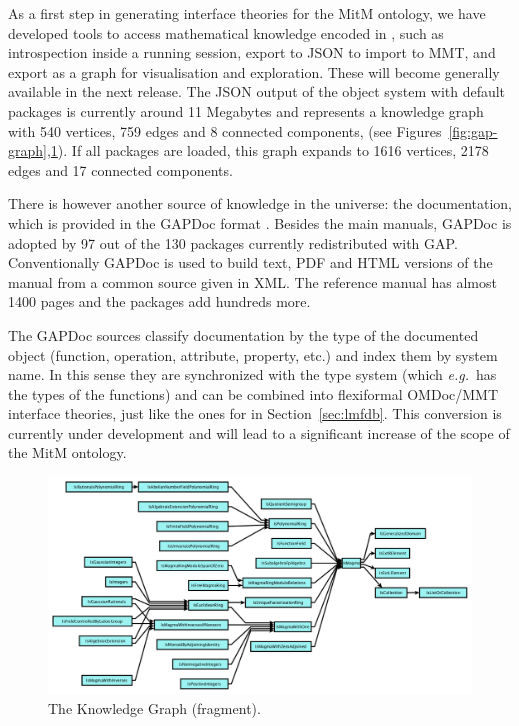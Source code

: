 As a first step in generating interface theories for the MitM ontology, we have developed
tools to access mathematical knowledge encoded in \GAP, such as introspection inside a
running \GAP session, export to JSON to import to MMT, and export as a graph for
visualisation and exploration. These will become generally available in the next \GAP
release. The JSON output of the \GAP object system with default packages is currently
around 11 Megabytes and represents a knowledge graph with 540 vertices, 759 edges and 8 connected
components, (see Figures~\ref{fig:gap-graph},\ref{fig:gap-ismagma}). If all
packages are loaded, this graph expands to 1616 vertices, 2178 edges and 17 connected
components.

There is however another source of knowledge in the \GAP universe: the documentation, which is
provided in the GAPDoc format \cite{gapdoc}. Besides the main manuals, GAPDoc
is adopted by 97 out of the 130 packages currently redistributed with
GAP. Conventionally GAPDoc is used to build text, PDF and HTML versions of the manual
from a common source given in XML. The reference manual has almost 1400 pages and the
packages add hundreds more.

The GAPDoc sources classify documentation by the type of the documented object (function,
operation, attribute, property, etc.) and index them by system name. In this sense they
are synchronized with the type system (which \emph{e.g.}\ has the types of the functions) and can
be combined into flexiformal OMDoc/MMT interface theories, just like the ones for \LMFDB
in Section~\ref{sec:lmfdb}. This conversion is currently under development and will lead
to a significant increase of the scope of the MitM ontology. 

\begin{figure}[ht]\centering
  \includegraphics[width=\textwidth]{gap-ismagma}
  \caption{The \GAP Knowledge Graph (fragment).\label{fig:gap-ismagma}}
\end{figure}

